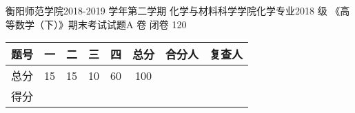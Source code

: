 \documentclass[twoside,12pt]{hnuexam}
\begin{document}
\examinformation%
{衡阳师范学院2018-2019 学年第二学期}%
{化学与材料科学学院化学专业2018 级}%
{《高等数学（下）》期末考试试题A 卷}%
{闭卷}%
{120}%

\vspace{-1.2em}

\fontsize{10.5pt}{1.5\baselineskip}\selectfont
\begin{table}[h]
	\centering
	\begin{tabular}{|c|c|c|c|c|c|c|c|}
		\hline
		题号 & 一 & 二 & 三 & 四 & 总分 & 合分人            & 复查人            \\
		\hline
		总分 & 15 & 15 & 10 & 60 & 100  & \multirow{2}{*}{} & \multirow{2}{*}{} \\
		\cline{1-6}
		得分 &    &    &    &    &      &                   &                   \\
		\hline
	\end{tabular}
\end{table}
\normalsize
\end{document}
